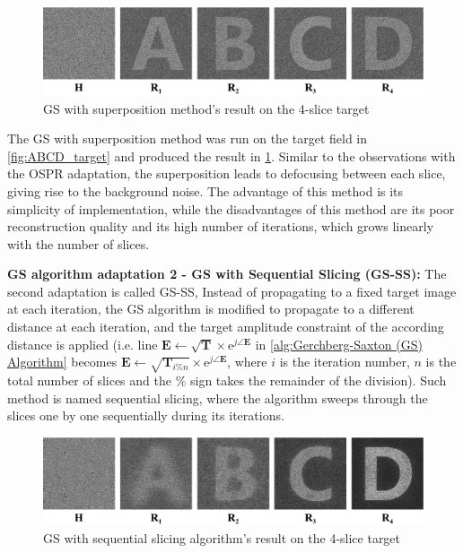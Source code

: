 \begin{figure}[H]
  \centering
  \includegraphics[width=1.0\textwidth]{ABCD/GS_noSS_ABCD.pdf}
  \caption{GS with superposition method's result on the 4-slice target}
  \label{fig:GS_noSS_ABCD}
\end{figure}

The GS with superposition method was run on the target field in \cref{fig:ABCD_target} and produced the result in \cref{fig:GS_noSS_ABCD}. Similar to the observations with the OSPR adaptation, the superposition leads to defocusing between each slice, giving rise to the background noise. The advantage of this method is its simplicity of implementation, while the disadvantages of this method are its poor reconstruction quality and its high number of iterations, which grows linearly with the number of slices.


\textbf{GS algorithm adaptation 2 - GS with Sequential Slicing (GS-SS): }
The second adaptation is called GS-SS, Instead of propagating to a fixed target image at each iteration, the GS algorithm is modified to propagate to a different distance at each iteration, and the target amplitude constraint of the according distance is applied (i.e. line $\textbf{E} \gets \sqrt{\textbf{T}} \times \mathrm{e}^{j\angle \textbf{E}}$ in \cref{alg:Gerchberg-Saxton (GS) Algorithm} becomes $\textbf{E} \gets \sqrt{\textbf{T}_{i\%n}} \times \mathrm{e}^{j\angle \textbf{E}}$, where $i$ is the iteration number, $n$ is the total number of slices and the $\%$ sign takes the remainder of the division). Such method is named sequential slicing, where the algorithm sweeps through the slices one by one sequentially during its iterations.

\begin{figure}[H]
  \centering
  \includegraphics[width=1.0\textwidth]{ABCD/GS_SS_ABCD.pdf}
  \caption{GS with sequential slicing algorithm's result on the 4-slice target}
  \label{fig:GS_SS_ABCD}
\end{figure}

